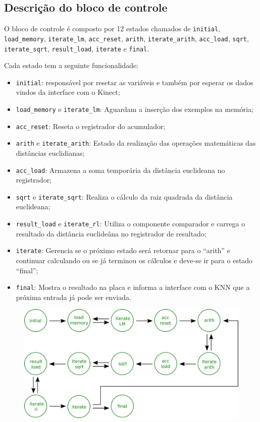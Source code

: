 \subsection{Descrição do bloco de controle}

O bloco de controle é composto por 12 estados chamados de \verb|initial|,
\verb|load_memory|, \verb|iterate_lm|, \verb|acc_reset|,
\verb|arith|, \verb|iterate_arith|, \verb|acc_load|, \verb|sqrt|,
\verb|iterate_sqrt|, \verb|result_load|, \verb|iterate| e 
\verb|final|.


Cada estado tem a seguinte funcionalidade:

\begin{itemize}
\item \verb|initial|: responsável por resetar as variáveis e também por esperar os dados vindos da interface com o Kinect;
\item \verb|load_memory| e \verb|iterate_lm|: Aguardam a inserção dos exemplos na memória;
\item \verb|acc_reset|: Reseta o registrador do acumulador;
\item \verb|arith| e \verb|iterate_arith|: Estado da realização das operações matemáticas das distâncias euclidianas;
\item \verb|acc_load|: Armazena a soma temporária da distância euclideana no registrador;
\item \verb|sqrt| e \verb|iterate_sqrt|: Realiza o cálculo da raiz quadrada da distância euclideana;
\item \verb|result_load| e \verb|iterate_rl|: Utiliza o componente comparador e carrega o resultado da distância euclideâna no registrador de resultado;
\item \verb|iterate|: Gerencia se o próximo estado será retornar para o ``arith'' e continuar calculando ou se já terminou os cálculos 
e deve-se ir para o estado ``final'';
\item \verb|final|: Mostra o resultado na placa e informa a interface com o KNN que a próxima entrada já pode ser enviada.
\end{itemize}

\begin{figure}[!ht]
\centering
\includegraphics[scale=0.2]{img/control_unit.png}
\end{figure}


